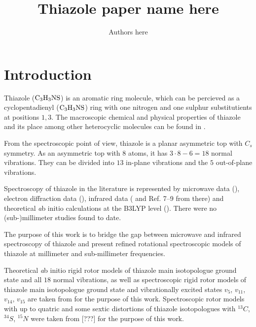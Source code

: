 \documentclass[a4paper]{article}
\title{Thiazole paper name here}
\author{Authors here}
\begin{document}
\maketitle

\begin{abstract}
\lipsum[20]
\end{abstract}


\section{Introduction}

Thiazole ($\rm C_3H_3NS$) is an aromatic ring molecule, which can be percieved as a cyclopentadienyl ($\rm C_3H_3NS$) ring with one nitrogen and one sulphur substitutients at positions $1, 3$. The macroscopic chemical and physical properties of thiazole and its place among other heterocyclic 
molecules can be found in \cite{heterocycles_book}. 

From the spectroscopic point of view, thiazole is a planar asymmetric top with $C_s$ symmetry. As an asymmetric top with $8$ atoms, it has $3 \cdot 8 - 6 = 18$ normal vibrations. They can be divided into $13$ in-plane vibrations and the $5$ out-of-plane vibrations. 


Spectroscopy of thiazole in the literature is represented by microwave data (\cite{bak1962microwave, nygaard1971microwave}), electron diffraction data (\cite{bone1999molecular}), infrared data (\cite{HEGELUND200763} and Ref. 7--9 from there) and theoretical {\emph ab initio} calculations at the B3LYP level (\cite{HEGELUND200763, palmer2008comparison}). There were no (sub-)millimeter studies found to date. 

The purpose of this work is to bridge the gap between microwave and infrared spectroscopy of thiazole and present refined rotational spectroscopic models of thiazole at millimeter and sub-millimeter frequencies. 

Theoretical {\emph ab initio} rigid rotor models of thiazole main isotopologue ground state and all $18$ normal vibrations, as well as spectroscopic rigid rotor models of thiazole main isotopologue ground state and vibrationally excited states $v_5$, $v_{11}$, $v_{14}$, $v_{15}$ are taken from \cite{HEGELUND200763} for the purpose of this work. Spectroscopic rotor models with up to quatric and some sextic distortions of thiazole isotopologues with $^{13}C$, $^{34}S$, $^{15}N$ were taken from [???] for the purpose of this work. 
\end{document}
